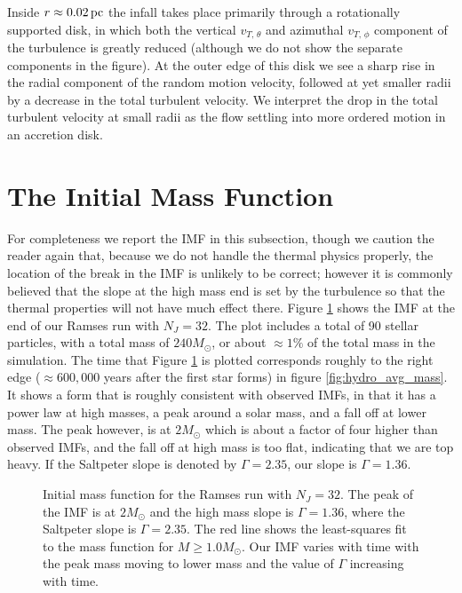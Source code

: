 \documentclass[../dissertation.tex]{subfiles}
\begin{document}
Inside $r\approx 0.02\,\rm pc$ the infall takes place primarily through a rotationally 
supported disk, in which both the vertical $v_{T,\, \theta}$ and 
azimuthal $v_{T,\, \phi}$ component of the turbulence is greatly reduced 
(although we do not show the separate components in the figure). At the 
outer edge of this 
disk we see a sharp rise in the radial component of the random motion velocity, 
followed at yet smaller radii by a decrease in the total turbulent velocity. 
We interpret the drop in the total turbulent
velocity at small radii as the flow settling into more ordered motion in an accretion disk.

\section{The Initial Mass Function}

For completeness we report the IMF in this subsection, though we caution the reader again that, because we do not handle the thermal physics properly, the location of the break in the IMF is unlikely to be correct; however it is commonly believed that the slope at the high mass end is set by the turbulence so that the thermal properties will not have much effect there.
Figure \ref{fig:hydro_imf} shows the IMF at the end of our Ramses run with $N_J = 32$. 
The plot includes a total of 90 stellar particles, with a total mass of $240 M_\odot$, or about  $\approx 1 \%$ of the total mass in the simulation. The time that Figure \ref{fig:hydro_imf} is plotted corresponds roughly to the right edge ($\approx 600,000$ years after the first star forms) in figure \ref{fig:hydro_avg_mass}. 
It shows a form that is roughly consistent with observed IMFs, in that it has a power law at high masses, a peak around a solar mass, and a fall off at lower mass. The peak however, is at $2 M_\odot$ which is about a factor of four higher than observed IMFs, and the fall off at high mass is too flat, indicating that we are top heavy. If the Saltpeter slope is denoted by $\Gamma = 2.35$, our slope is $\Gamma = 1.36$. 

\begin{figure}[htb]
\caption[Hydro Initial Mass Function]{Initial mass function for the Ramses run with $N_J = 32$. The peak of the IMF is at $2 M_\odot$ and the high mass slope is $\Gamma = 1.36$, where the Saltpeter slope is $\Gamma = 2.35$. The red line shows the least-squares fit to the mass function for $M \geq 1.0 M_\odot$. Our IMF varies with time with the peak mass moving to lower mass and the value of $\Gamma$ increasing with time. \label{fig:hydro_imf}}
\end{figure}
\end{document}
